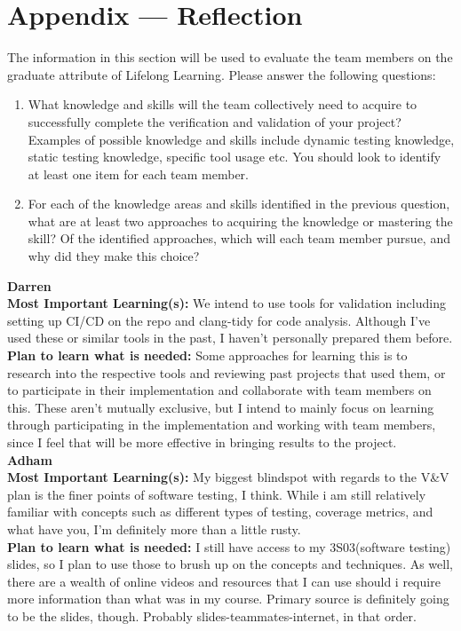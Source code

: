 \documentclass[12pt, titlepage]{article}
\begin{document}

\newpage{}
\section*{Appendix --- Reflection}

The information in this section will be used to evaluate the team members on the
graduate attribute of Lifelong Learning.  Please answer the following questions:

\begin{enumerate}
  \item What knowledge and skills will the team collectively need to acquire to
  successfully complete the verification and validation of your project?
  Examples of possible knowledge and skills include dynamic testing knowledge,
  static testing knowledge, specific tool usage etc.  You should look to
  identify at least one item for each team member.
  \item For each of the knowledge areas and skills identified in the previous
  question, what are at least two approaches to acquiring the knowledge or
  mastering the skill?  Of the identified approaches, which will each team
  member pursue, and why did they make this choice?
\end{enumerate}

\noindent\textbf{Darren}\\
\textbf{Most Important Learning(s):} We intend to use tools for validation including setting up CI/CD on the repo and clang-tidy for code analysis. Although I've used these or similar tools in the past, I haven't personally prepared them before.\\
\textbf{Plan to learn what is needed:} Some approaches for learning this is to research into the respective tools and reviewing past projects that used them, or to participate in their implementation and collaborate with team members on this. These aren't mutually exclusive, but I intend to mainly focus on learning through participating in the implementation and working with team members, since I feel that will be more effective in bringing results to the project.\\

\noindent\textbf{Adham}\\
\textbf{Most Important Learning(s):} My biggest blindspot with regards to the V\&V plan is the finer points of software testing, I think. While i am still relatively familiar
with concepts such as different types of testing, coverage metrics, and what have you, I'm definitely more than a little rusty.\\
\textbf{Plan to learn what is needed:} I still have access to my 3S03(software testing) slides, so I plan to use those to brush up on the concepts and techniques. As well,
there are a wealth of online videos and resources that I can use should i require more information than what was in my course. Primary source is definitely going to be the
slides, though. Probably slides-teammates-internet, in that order. \\
\end{document}
